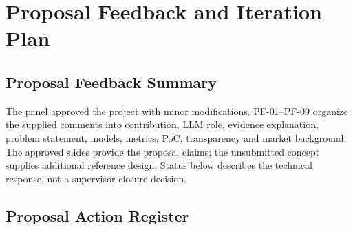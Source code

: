 \chapter{Proposal Feedback and Iteration Plan}
\section{Proposal Feedback Summary}
The panel approved the project with minor modifications. PF-01--PF-09 organize the supplied comments into contribution, LLM role, evidence explanation, problem statement, models, metrics, PoC, transparency and market background. The approved slides provide the proposal claims; the unsubmitted concept supplies additional reference design. Status below describes the technical response, not a supervisor closure decision.
\section{Proposal Action Register}
\label{sec:actions}\label{app:actions}
\begingroup\small
